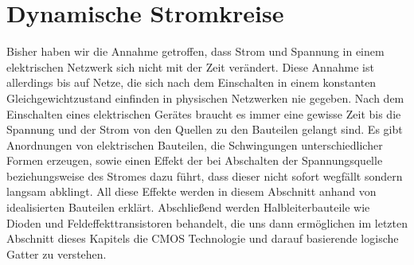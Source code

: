 \documentclass[11pt,a4paper,leqno]{report}
\numberwithin{equation}{chapter}
\begin{document}
\section{Dynamische Stromkreise}
Bisher haben wir die Annahme getroffen, dass Strom und Spannung in einem elektrischen Netzwerk sich nicht mit der Zeit ver\"andert. Diese Annahme ist allerdings bis auf Netze, die sich nach dem Einschalten in einem konstanten Gleichgewichtzustand einfinden in physischen Netzwerken nie gegeben. Nach dem Einschalten eines elektrischen Ger\"ates braucht es immer eine gewisse Zeit bis die Spannung und der Strom von den Quellen zu den Bauteilen gelangt sind. Es gibt Anordnungen von elektrischen Bauteilen, die Schwingungen unterschiedlicher Formen erzeugen, sowie einen Effekt der bei Abschalten der Spannungsquelle beziehungsweise des Stromes dazu f\"uhrt, dass dieser nicht sofort wegf\"allt sondern langsam abklingt. All diese Effekte werden in diesem Abschnitt anhand von idealisierten Bauteilen erkl\"art. Abschließend werden Halbleiterbauteile wie Dioden und Feldeffekttransistoren behandelt, die uns dann erm\"oglichen im letzten Abschnitt dieses Kapitels die CMOS Technologie und darauf basierende logische Gatter zu verstehen.
\end{document}
